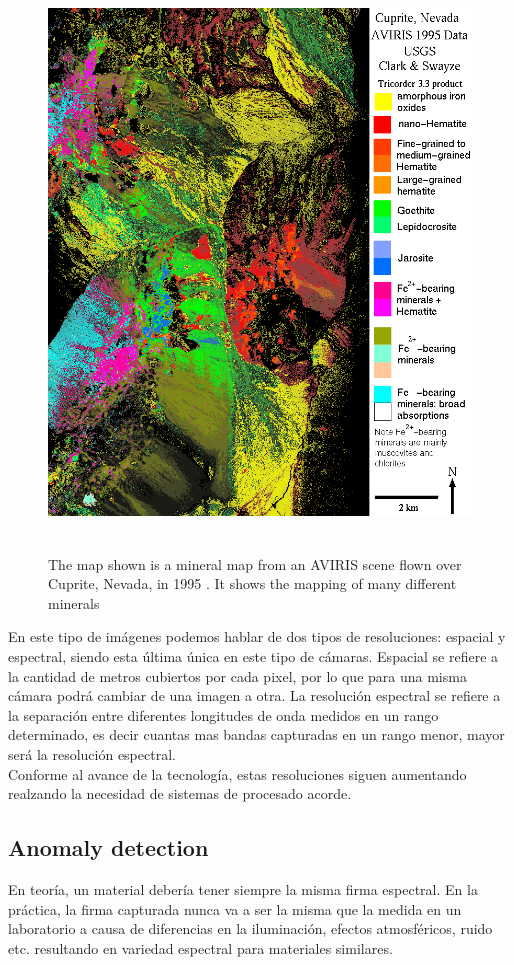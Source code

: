 \begin{figure}[h!]
\centering
\includegraphics[height=6in]{figures/cuprite.png}
\caption{The map shown is a mineral map from an AVIRIS scene flown over Cuprite, Nevada, in 1995 \citep{noauthor_aviris_nodate}. It shows the mapping of many different minerals}
  \label{fig:cuprite}
\end{figure}
\clearpage


En este tipo de imágenes podemos hablar de dos tipos de resoluciones: espacial y espectral, siendo esta última única en este tipo de cámaras. Espacial se refiere a la cantidad de metros cubiertos por cada pixel, por lo que para una misma cámara podrá cambiar de una imagen a otra. La resolución espectral se refiere a la separación entre diferentes longitudes de onda medidos en un rango determinado, es decir cuantas mas bandas capturadas en un rango menor, mayor será la resolución espectral\cite{amigo_chapter_2020}.
\\

Conforme al avance de la tecnología, estas resoluciones siguen aumentando realzando la necesidad de sistemas de procesado acorde.

\subsection{Anomaly detection}
En teoría, un material debería tener siempre la misma firma espectral. En la práctica, la firma capturada nunca va a ser la misma que la medida en un laboratorio a causa de diferencias en la iluminación, efectos atmosféricos, ruido etc. resultando en variedad espectral para materiales similares\cite{borsoi_spectral_2020}.

